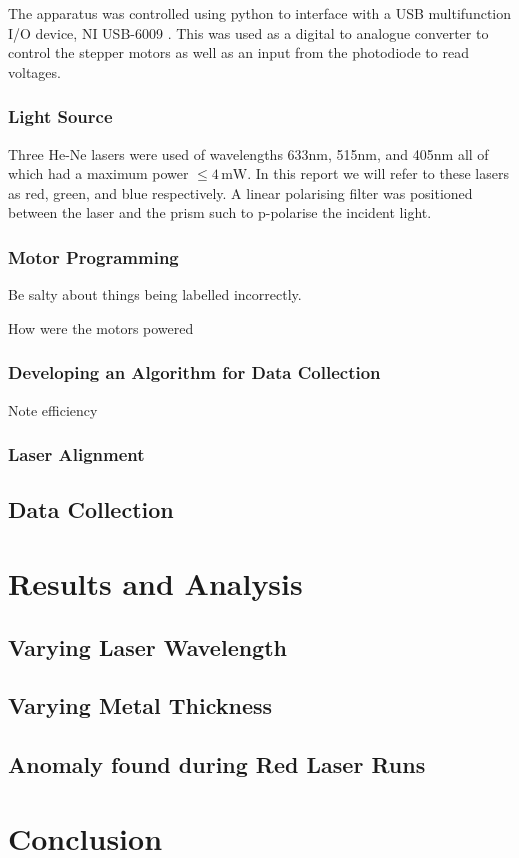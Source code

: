 \documentclass[%
reprint,
amsmath,amssymb,
aps,
]{revtex4-2}
\begin{document}
			The apparatus was controlled using python to interface with a USB multifunction I/O device, NI USB-6009 \cite{nationalInstruments}. This was used as a digital to analogue converter to control the stepper motors as well as an input from the photodiode to read voltages.

			\subsubsection{Light Source}
				Three He-Ne lasers were used of wavelengths 633nm, 515nm, and 405nm all of which had a maximum power $\le 4 \,\text{mW}$. In this report we will refer to these lasers as red, green, and blue respectively. A linear polarising filter was positioned between the laser and the prism such to p-polarise the incident light.
			
			\subsubsection{Motor Programming}
				Be salty about things being labelled incorrectly.
				
				How were the motors powered
			
			\subsubsection{Developing an Algorithm for Data Collection}
				Note efficiency
			
			\subsubsection{Laser Alignment}
			
		\subsection{Data Collection}
			\subsubsection{}
		
		
	
	\section{Results and Analysis}
		\subsection{Varying Laser Wavelength}
		
		\subsection{Varying Metal Thickness}
	
		\subsection{Anomaly found during Red Laser Runs}

	\section{Conclusion}
		
		
	\newpage
		
	\newpage
	\appendix
		
		
\end{document}
